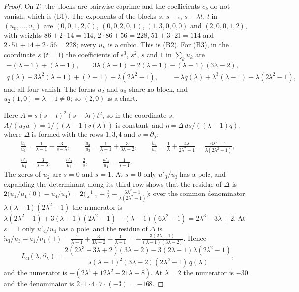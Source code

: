 \begin{proof}
On $T_{1}$ the blocks are pairwise coprime and the coefficients $c_{k}$ do
not vanish, which is (B1). The exponents of the blocks $s$, $s-t$,
$s-\lambda t$, $t$ in $(u_{0},\dots,u_{4})$ are $(0,0,1,2,0)$,
$(0,0,2,0,1)$, $(1,3,0,0,0)$ and $(2,0,0,1,2)$, with weights
$86+2\cdot14=114$, $2\cdot86+56=228$, $51+3\cdot21=114$ and
$2\cdot51+14+2\cdot56=228$; every $u_{k}$ is a cubic. This is (B2). For
(B3), in the coordinate $s$ ($t=1$) the coefficients of $s^{3}$, $s^{2}$,
$s$ and $1$ in $\sum_{k}u_{k}$ are
\begin{gather*}
  -(\lambda-1)+(\lambda-1),\qquad 3\lambda(\lambda-1)-2(\lambda-1)-(\lambda-1)
  (3\lambda-2),\\
  q(\lambda)-3\lambda^{2}(\lambda-1)+(\lambda-1)+\lambda(2\lambda^{2}-1),
  \qquad -\lambda q(\lambda)+\lambda^{3}(\lambda-1)-\lambda(2\lambda^{2}-1),
\end{gather*}
and all four vanish. The forms $u_{2}$ and $u_{0}$ share no block, and
$u_{2}(1,0)=\lambda-1\ne0$; so $(2,0)$ is a chart.

Here $A=s(s-t)^{2}(s-\lambda t)t^{2}$, so in the coordinate $s$,
$A/(u_{2}u_{0})=1/((\lambda-1)q(\lambda))$ is constant, and $\eta=\Delta\,ds/
((\lambda-1)q)$, where $\Delta$ is formed with the rows $1,3,4$ and $v=
\partial_{\lambda}$:
\begin{gather*}
  \frac{\dot u_{1}}{u_{1}}=\frac1{\lambda-1}-\frac3{s-\lambda},\qquad
  \frac{\dot u_{3}}{u_{3}}=\frac1{\lambda-1}+\frac3{3\lambda-2},\qquad
  \frac{\dot u_{4}}{u_{4}}=\frac1\lambda+\frac{4\lambda}{2\lambda^{2}-1}
  =\frac{6\lambda^{2}-1}{\lambda(2\lambda^{2}-1)},\\
  \frac{u'_{1}}{u_{1}}=\frac3{s-\lambda},\qquad\frac{u'_{3}}{u_{3}}=
  \frac2s,\qquad\frac{u'_{4}}{u_{4}}=\frac1{s-1}.
\end{gather*}
The zeros of $u_{2}$ are $s=0$ and $s=1$. At $s=0$ only $u'_{3}/u_{3}$ has a
pole, and expanding the determinant along its third row shows that the
residue of $\Delta$ is $2\bigl(\dot u_{1}/u_{1}(0)-\dot u_{4}/u_{4}\bigr)=
2\bigl(\frac1{\lambda-1}+\frac3\lambda-\frac{6\lambda^{2}-1}{\lambda
(2\lambda^{2}-1)}\bigr)$; over the common denominator $\lambda(\lambda-1)
(2\lambda^{2}-1)$ the numerator is $\lambda(2\lambda^{2}-1)+3(\lambda-1)
(2\lambda^{2}-1)-(\lambda-1)(6\lambda^{2}-1)=2\lambda^{3}-3\lambda+2$. At
$s=1$ only $u'_{4}/u_{4}$ has a pole, and the residue of $\Delta$ is
$\dot u_{3}/u_{3}-\dot u_{1}/u_{1}(1)=\frac1{\lambda-1}+\frac3{3\lambda-2}
-\frac4{\lambda-1}=-\frac{3(2\lambda-1)}{(\lambda-1)(3\lambda-2)}$. Hence
\[
  I_{20}(\lambda,\partial_{\lambda})=\frac{2(2\lambda^{3}-3\lambda+2)(3\lambda
  -2)-3(2\lambda-1)\lambda(2\lambda^{2}-1)}{\lambda(\lambda-1)^{2}(3\lambda-2)
  (2\lambda^{2}-1)\,q(\lambda)},
\]
and the numerator is $-(2\lambda^{3}+12\lambda^{2}-21\lambda+8)$. At
$\lambda=2$ the numerator is $-30$ and the denominator is
$2\cdot1\cdot4\cdot7\cdot(-3)=-168$.
\end{proof}

